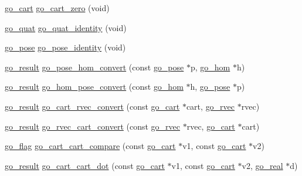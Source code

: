 \begin{DoxyCompactItemize}
\item 
\hyperlink{structgomotion_1_1go__cart}{go\-\_\-cart} \hyperlink{namespacegomotion_aadcf705cf7a6b2a33fb3fb65f5b1a517}{go\-\_\-cart\-\_\-zero} (void)
\item 
\hyperlink{structgomotion_1_1go__quat}{go\-\_\-quat} \hyperlink{namespacegomotion_abfb9197b7cceb73fdd68bad553cba624}{go\-\_\-quat\-\_\-identity} (void)
\item 
\hyperlink{structgomotion_1_1go__pose}{go\-\_\-pose} \hyperlink{namespacegomotion_ab1257b2f7a291d528ea01466abff5ac8}{go\-\_\-pose\-\_\-identity} (void)
\item 
\hyperlink{gotypes_8h_a55d48b38cd959f63c7e8db8337a9792a}{go\-\_\-result} \hyperlink{namespacegomotion_ae9423c9f1b2aaf9c6939ed15588f2f25}{go\-\_\-pose\-\_\-hom\-\_\-convert} (const \hyperlink{structgomotion_1_1go__pose}{go\-\_\-pose} $\ast$p, \hyperlink{structgomotion_1_1go__hom}{go\-\_\-hom} $\ast$h)
\item 
\hyperlink{gotypes_8h_a55d48b38cd959f63c7e8db8337a9792a}{go\-\_\-result} \hyperlink{namespacegomotion_a869b48a3a49883c182f73645cc0d2f9e}{go\-\_\-hom\-\_\-pose\-\_\-convert} (const \hyperlink{structgomotion_1_1go__hom}{go\-\_\-hom} $\ast$h, \hyperlink{structgomotion_1_1go__pose}{go\-\_\-pose} $\ast$p)
\item 
\hyperlink{gotypes_8h_a55d48b38cd959f63c7e8db8337a9792a}{go\-\_\-result} \hyperlink{namespacegomotion_a055754ba16cfa9577b99cbe659373308}{go\-\_\-cart\-\_\-rvec\-\_\-convert} (const \hyperlink{structgomotion_1_1go__cart}{go\-\_\-cart} $\ast$cart, \hyperlink{structgomotion_1_1go__rvec}{go\-\_\-rvec} $\ast$rvec)
\item 
\hyperlink{gotypes_8h_a55d48b38cd959f63c7e8db8337a9792a}{go\-\_\-result} \hyperlink{namespacegomotion_a20ddc08f42a87ab4d96a53e0670a4384}{go\-\_\-rvec\-\_\-cart\-\_\-convert} (const \hyperlink{structgomotion_1_1go__rvec}{go\-\_\-rvec} $\ast$rvec, \hyperlink{structgomotion_1_1go__cart}{go\-\_\-cart} $\ast$cart)
\item 
\hyperlink{gotypes_8h_ae890d9a0ddecc0d3073622cc4312092d}{go\-\_\-flag} \hyperlink{namespacegomotion_aa971bf43a465567a0dd24c4ff38d8054}{go\-\_\-cart\-\_\-cart\-\_\-compare} (const \hyperlink{structgomotion_1_1go__cart}{go\-\_\-cart} $\ast$v1, const \hyperlink{structgomotion_1_1go__cart}{go\-\_\-cart} $\ast$v2)
\item 
\hyperlink{gotypes_8h_a55d48b38cd959f63c7e8db8337a9792a}{go\-\_\-result} \hyperlink{namespacegomotion_aaa7f752392e7056e3636924a001a8731}{go\-\_\-cart\-\_\-cart\-\_\-dot} (const \hyperlink{structgomotion_1_1go__cart}{go\-\_\-cart} $\ast$v1, const \hyperlink{structgomotion_1_1go__cart}{go\-\_\-cart} $\ast$v2, \hyperlink{gotypes_8h_afd666a2393eebd71ee455846ac9def9b}{go\-\_\-real} $\ast$d)

\end{DoxyCompactItemize}
